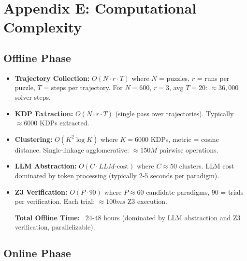 
\section{Appendix E: Computational Complexity}

\subsection{Offline Phase}

\begin{itemize}
    \item \textbf{Trajectory Collection:} $O(N \cdot r \cdot T)$ where $N$ = puzzles, $r$ = runs per puzzle, $T$ = steps per trajectory. For $N=600$, $r=3$, avg $T=20$: $\approx 36,000$ solver steps.

    \item \textbf{KDP Extraction:} $O(N \cdot r \cdot T)$ (single pass over trajectories). Typically $\approx 6000$ KDPs extracted.

    \item \textbf{Clustering:} $O(K^2 \log K)$ where $K = 6000$ KDPs, metric = cosine distance. Single-linkage agglomerative: $\approx 150M$ pairwise operations.

    \item \textbf{LLM Abstraction:} $O(C \cdot LLM\text{-cost})$ where $C \approx 50$ clusters. LLM cost dominated by token processing (typically 2-5 seconds per paradigm).

    \item \textbf{Z3 Verification:} $O(P \cdot 90)$ where $P \approx 60$ candidate paradigms, 90 = trials per verification. Each trial: $\approx 100ms$ Z3 execution.

    \textbf{Total Offline Time:} ~24-48 hours (dominated by LLM abstraction and Z3 verification, parallelizable).
\end{itemize}

\subsection{Online Phase}

